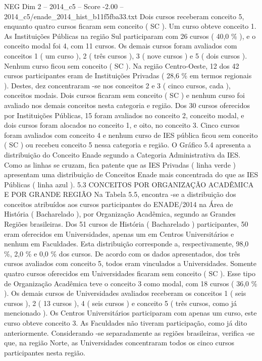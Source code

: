 \begin{textsample}{NEG Dim 2 – 2014\_c5 – Score -2.00 – 2014\_c5/enade\_2014\_hist\_b11f5fba33.txt}
Dois cursos receberam conceito 5, enquanto quatro cursos ficaram sem conceito ( SC ).
Um curso obteve conceito 1.
As Instituições Públicas na região Sul participaram com 26 cursos ( 40,0 \% ), e o conceito modal foi 4, com 11 cursos.
Os demais cursos foram avaliados com conceitos 1 ( um curso ), 2 ( três cursos ), 3 ( nove cursos ) e 5 ( dois cursos ).
Nenhum curso ficou sem conceito ( SC ).
Na região Centro-Oeste, 12 dos 42 cursos participantes eram de Instituições Privadas ( 28,6 \% em termos regionais ).
Destes, dez concentraram -se nos conceitos 2 e 3 ( cinco cursos, cada ), conceitos modais.
Dois cursos ficaram sem conceito ( SC ) e nenhum curso foi avaliado nos demais conceitos nesta categoria e região.
Dos 30 cursos oferecidos por Instituições Públicas, 15 foram avaliados no conceito 2, conceito modal, e dois cursos foram alocados no conceito 1, e oito, no conceito 3.
Cinco cursos foram avaliados com conceito 4 e nenhum curso de IES pública ficou sem conceito ( SC ) ou recebeu conceito 5 nessa categoria e região.
O Gráfico 5.4 apresenta a distribuição do Conceito Enade segundo a Categoria Administrativa da IES.
Como as linhas se cruzam, fica patente que as IES Privadas ( linha verde ) apresentam uma distribuição de Conceitos Enade mais concentrada do que as IES Públicas ( linha azul ). 5.3 CONCEITOS POR ORGANIZAÇÃO ACADÊMICA E POR GRANDE REGIÃO Na Tabela 5.5, encontra -se a distribuição dos conceitos atribuídos aos cursos participantes do ENADE/2014 na Área de História ( Bacharelado ), por Organização Acadêmica, segundo as Grandes Regiões brasileiras.
Dos 51 cursos de História ( Bacharelado ) participantes, 50 eram oferecidos em Universidades, apenas um em Centros Universitários e nenhum em Faculdades.
Esta distribuição corresponde a, respectivamente, 98,0 \%, 2,0 \% e 0,0 \% dos cursos.
De acordo com os dados apresentados, dos três cursos avaliados com conceito 5, todos eram vinculados a Universidades.
Somente quatro cursos oferecidos em Universidades ficaram sem conceito ( SC ).
Esse tipo de Organização Acadêmica teve o conceito 3 como modal, com 18 cursos ( 36,0 \% ).
Os demais cursos de Universidades avaliados receberam os conceitos 1 ( seis cursos ), 2 ( 13 cursos ), 4 ( seis cursos ) e conceito 5 ( três cursos, como já mencionado ).
Os Centros Universitários participaram com apenas um curso, este curso obteve conceito 3.
As Faculdades não tiveram participação, como já dito anteriormente.
Considerando -se separadamente as regiões brasileiras, verifica -se que, na região Norte, as Universidades concentraram todos os cinco cursos participantes nesta região.

\end{textsample}
